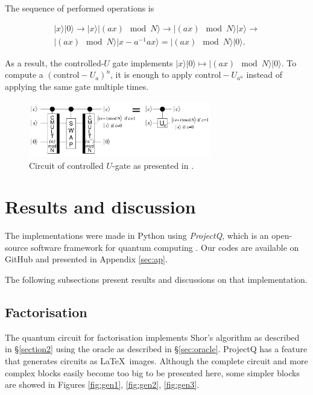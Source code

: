 \documentclass[a4paper, 10pt]{article}
\numberwithin{equation}{section}
\numberwithin{figure}{section}
\numberwithin{table}{section}
\begin{document}
The sequence of performed operations is

\begin{multline*}
|x\rangle|0\rangle \rightarrow |x\rangle|(ax)\mod N\rangle \rightarrow |(ax)\mod N\rangle|x\rangle \rightarrow\\
|(ax)\mod N\rangle|x-a^{-1}ax\rangle = |(ax)\mod N\rangle|0\rangle.
\end{multline*}

As a result, the controlled-$U$ gate implements $|x\rangle|0\rangle \mapsto |(ax) \mod N\rangle|0\rangle$. To compute a $(\text{control}-U_a)^n$, it is enough to apply $\text{control}-U_{a^n}$ instead of applying the same gate multiple times.

\begin{figure}[h!]
	\centering
	\includegraphics[width=8cm]{Figures/ugate}
	\caption{Circuit of controlled $U$-gate as presented in \cite{beauregard}.}
	\label{fig-ugate}
\end{figure}

\clearpage
\newpage
\section{Results and discussion}

The implementations were made in Python using \textit{ProjectQ}, which is an open-source software framework for quantum computing \cite{projectq, steiger}. Our codes are available on GitHub \cite{git} and presented in Appendix \ref{sec:ap}.

The following subsections present results and discussions on that implementation.

\subsection{Factorisation}

The quantum circuit for factorisation implements Shor's algorithm as described in \S\ref{section2} using the oracle as described in \S\ref{sec:oracle}. ProjectQ has a feature that generates circuits as \LaTeX\ images. Although the complete circuit and more complex blocks easily become too big to be presented here, some simpler blocks are showed in Figures \ref{fig:gen1}, \ref{fig:gen2}, \ref{fig:gen3}.
\end{document}
